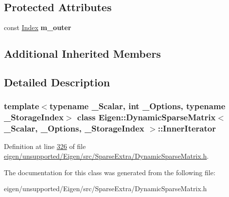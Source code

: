 \subsection*{Protected Attributes}
\begin{DoxyCompactItemize}
\item 
\mbox{\label{class_eigen_1_1_dynamic_sparse_matrix_1_1_inner_iterator_ad2214f316d06f35c65104de753cc5989}} 
const \hyperlink{group___core___module_a554f30542cc2316add4b1ea0a492ff02}{Index} {\bfseries m\+\_\+outer}
\end{DoxyCompactItemize}
\subsection*{Additional Inherited Members}


\subsection{Detailed Description}
\subsubsection*{template$<$typename \+\_\+\+Scalar, int \+\_\+\+Options, typename \+\_\+\+Storage\+Index$>$\newline
class Eigen\+::\+Dynamic\+Sparse\+Matrix$<$ \+\_\+\+Scalar, \+\_\+\+Options, \+\_\+\+Storage\+Index $>$\+::\+Inner\+Iterator}



Definition at line \hyperlink{eigen_2unsupported_2_eigen_2src_2_sparse_extra_2_dynamic_sparse_matrix_8h_source_l00326}{326} of file \hyperlink{eigen_2unsupported_2_eigen_2src_2_sparse_extra_2_dynamic_sparse_matrix_8h_source}{eigen/unsupported/\+Eigen/src/\+Sparse\+Extra/\+Dynamic\+Sparse\+Matrix.\+h}.



The documentation for this class was generated from the following file\+:\begin{DoxyCompactItemize}
\item 
eigen/unsupported/\+Eigen/src/\+Sparse\+Extra/\+Dynamic\+Sparse\+Matrix.\+h\end{DoxyCompactItemize}
